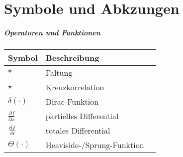 \chapter*{Symbole und Abkzungen}
%
\paragraph*{Operatoren und Funktionen}
\begin{tabularx}{\textwidth}{@{}l@{\qquad}X@{\quad}p{18mm}}
\toprule
	Symbol & Beschreibung & \\ \midrule
	$*$ & Faltung\\
	$\star$ & Kreuzkorrelation\\
	$\delta(\cdot)$ & Dirac-Funktion\\
	$\frac{\partial f}{\partial x}$ & partielles Differential\\
	$\frac{\mathrm{d} f}{\mathrm{d} t}$ & totales Differential\\
	$\Theta(\cdot)$ & Heaviside-/Sprung-Funktion\\
\end{tabularx}
%
